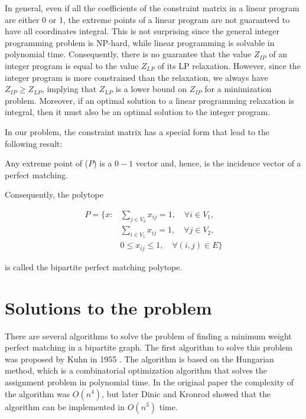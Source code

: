 In general, even if all the coefficients of the constraint matrix in a linear program are either 0 or 1, the extreme points of a linear program are not guaranteed to have all coordinates integral. This is not surprising since the general integer programming problem is NP-hard, while linear programming is solvable in polynomial time. Consequently, there is no guarantee that the value $Z_{IP}$ of an integer program is equal to the value $Z_{LP}$ of its LP relaxation. However, since the integer program is more constrained than the relaxation, we always have $Z_{IP} \geq Z_{LP}$, implying that $Z_{LP}$ is a lower bound on $Z_{IP}$ for a minimization problem. Moreover, if an optimal solution to a linear programming relaxation is integral, then it must also be an optimal solution to the integer program.

In our problem, the constraint matrix has a special form that lead to the following result: 

\begin{theorem}
    Any extreme point of ($P$) is a $0-1$ vector and, hence, is the incidence vector of a perfect matching.
\end{theorem}

Consequently, the polytope

\begin{equation}
    \begin{aligned}
        P = \{ x: & \sum_{j \in V_2} x_{ij} = 1, \quad \forall i \in V_1, \\
        & \sum_{i \in V_1} x_{ij} = 1, \quad \forall j \in V_2, \\
        & 0 \leq x_{ij} \leq 1, \quad \forall (i, j) \in E \}
    \end{aligned}
\end{equation}

is called the bipartite perfect matching polytope. 

\section{Solutions to the problem}
There are several algorithms to solve the problem of finding a minimum weight perfect matching in a bipartite graph. The first algorithm to solve this problem was proposed by Kuhn in 1955 \cite{kuhn1955hungarian}. The algorithm is based on the Hungarian method, which is a combinatorial optimization algorithm that solves the assignment problem in polynomial time. In the original paper the complexity of the algorithm was $O(n^4)$, but later Dinic and Kronrod \cite{dinic1969algorithm} showed that the algorithm can be implemented in $O(n^3)$ time.


